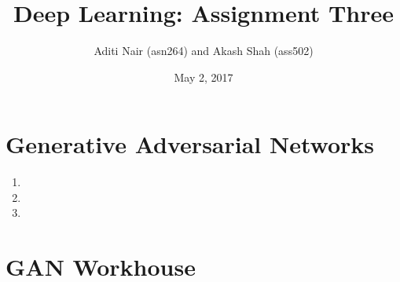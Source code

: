 \documentclass[a4paper]{article}
\title{Deep Learning: Assignment Three}
\author{Aditi Nair (asn264) and Akash Shah (ass502)}
\date{May 2, 2017}
\begin{document}
\maketitle

\section{Generative Adversarial Networks}

\begin{enumerate}
\item{}
\item{}
\item{}
\end{enumerate}

\section{GAN Workhouse}
\end{document}
